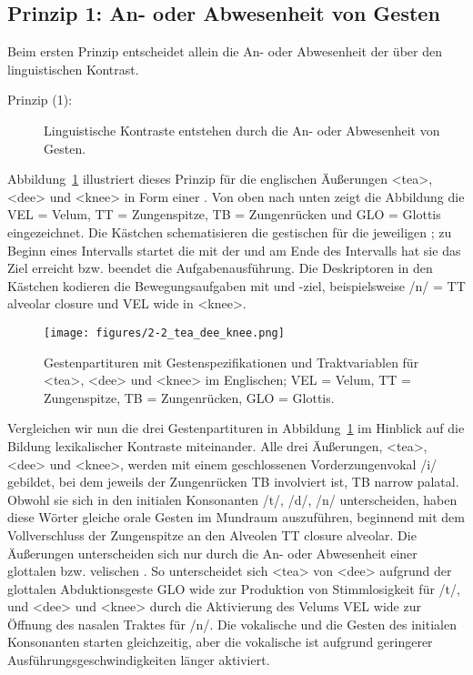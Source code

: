 \subsection{Prinzip 1: An- oder Abwesenheit von Gesten}
\label{subsec:020101}

Beim ersten Prinzip entscheidet allein die An- oder Abwesenheit der  über den linguistischen Kontrast. 

\begin{description}
	\item[Prinzip (1):] Linguistische Kontraste entstehen durch die An- oder Abwesenheit von Gesten.
\end{description}

Abbildung~\ref{figure:0202} illustriert dieses Prinzip für die englischen Äußerungen <tea>, <dee> und <knee> in Form einer . Von oben nach unten zeigt die Abbildung die  VEL = Velum, TT = Zungenspitze, TB = Zungenrücken und GLO = Glottis eingezeichnet. Die Kästchen schematisieren die gestischen  für die jeweiligen ; zu Beginn eines Intervalls startet die  mit der  und am Ende des Intervalls hat sie das Ziel erreicht bzw. beendet die Aufgabenausführung. Die Deskriptoren in den Kästchen kodieren die Bewegungsaufgaben mit  und -ziel, beispielsweise /n/ = {TT alveolar closure} und {VEL wide} in <knee>.


\begin{figure}
	\texttt{[image: figures/2-2\_tea\_dee\_knee.png]}
	\caption{Gestenpartituren mit Gestenspezifikationen und Traktvariablen für <tea>, <dee> und <knee> im Englischen; VEL = Velum, TT = Zungenspitze, TB = Zungenrücken, GLO = Glottis.}
	\label{figure:0202}
\end{figure}


Vergleichen wir nun die drei Gestenpartituren in Abbildung~\ref{figure:0202} im Hinblick auf die Bildung lexikalischer Kontraste miteinander. Alle drei Äußerungen, <tea>, <dee> und <knee>, werden mit einem geschlossenen Vorderzungenvokal /i/ gebildet, bei dem jeweils der Zungenrücken TB involviert ist, {TB narrow palatal}. Obwohl sie sich  in den initialen Konsonanten /t/, /d/, /n/ unterscheiden, haben diese Wörter gleiche orale Gesten im Mundraum auszuführen, beginnend mit dem Vollverschluss der Zungenspitze an den Alveolen {TT closure alveolar}. Die Äußerungen unterscheiden sich nur durch die An- oder Abwesenheit einer glottalen bzw. velischen . So unterscheidet sich <tea> von <dee> aufgrund der glottalen Abduktionsgeste {GLO wide} zur Produktion von Stimmlosigkeit für /t/, und <dee> und <knee> durch die Aktivierung des Velums {VEL wide} zur Öffnung des nasalen Traktes für /n/. Die vokalische  und die Gesten des initialen Konsonanten starten gleichzeitig, aber die vokalische  ist aufgrund geringerer Ausführungsgeschwindigkeiten länger aktiviert.



